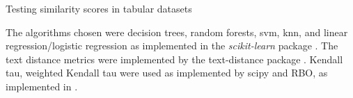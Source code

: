 \begin{algorithm}[hbtp]
\SetAlgoLined



 \caption{Testing similarity scores in tabular datasets}
 \label{alg:simil_1}

\end{algorithm}



The algorithms chosen were decision trees, random forests, \ac{svm},  \ac{knn}, and linear regression/logistic regression as implemented in the \textit{scikit-learn} package \cite{scikit-learn}. The text distance metrics were implemented by the text-distance package \cite{orsiniumTextdistanceComputeDistance}. Kendall tau, weighted Kendall tau were used as implemented by scipy \cite{virtanenSciPyFundamentalAlgorithms2020a} and RBO, as implemented in \cite{chenRankbiasedOverlapRBO2023}.






